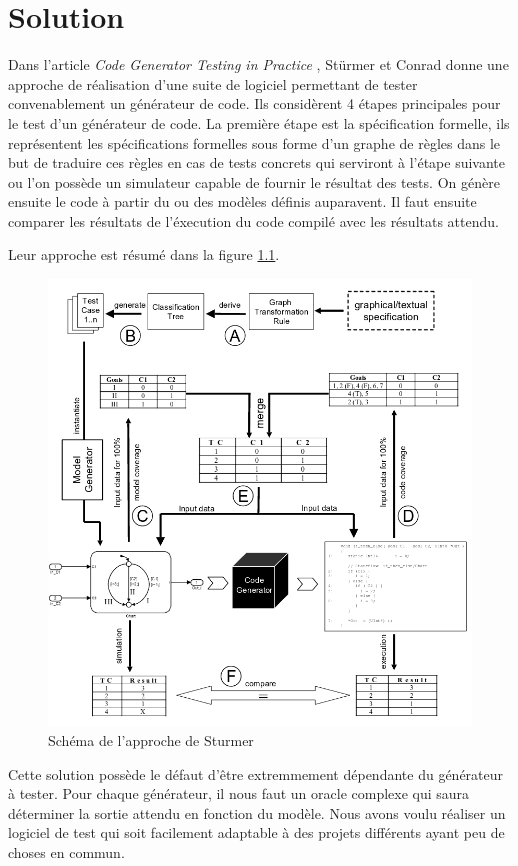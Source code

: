 \chapter{Solution}


Dans l'article \textit{Code Generator Testing in Practice} \cite{sturmer2004}, Stürmer et Conrad donne une approche de réalisation
d'une suite de logiciel permettant de tester convenablement un générateur de code.
Ils considèrent 4 étapes principales pour le test d'un générateur de code. La première étape est la spécification formelle, ils représentent les spécifications
formelles sous forme d'un graphe de règles dans le but de traduire ces règles en cas de tests concrets qui serviront à l'étape suivante ou l'on possède
un simulateur capable de fournir le résultat des tests. On génère ensuite le code à partir du ou des modèles définis auparavent. Il faut ensuite
comparer les résultats de l'éxecution du code compilé avec les résultats attendu.

Leur approche est résumé dans la figure \ref{codegen}.


\begin{figure}[!ht]
	\centering
	\includegraphics[width=0.7\linewidth]{images/codegen.png}
	\caption{Schéma de l'approche de Sturmer}
	\label{codegen}
\end{figure}


Cette solution possède le défaut d'être extremmement dépendante du générateur à tester. Pour chaque générateur, il nous faut un oracle complexe
qui saura déterminer la sortie attendu en fonction du modèle. Nous avons voulu réaliser un logiciel de test qui soit facilement adaptable à des
projets différents ayant peu de choses en commun.

